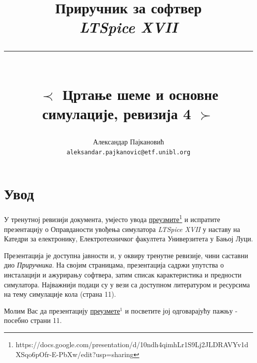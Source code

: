 

\title{
	\LARGE Приручник за софтвер \\ \smallskip
	\textit{LTSpice XVII} \\ 
	\noindent\rule{\textwidth}{0.1pt} \\ \medskip
	\large $\prec$ Цртање шеме и основне симулације, ревизија 4 $\succ$
}

\author{Александар Пајкановић \\
\footnotesize \texttt{aleksandar.pajkanovic@etf.unibl.org}}



\maketitle


\chapter{Увод}
\label{intro}

\noindent У тренутној ревизији документа, умјесто увода \href{https://docs.google.com/presentation/d/10ndh4qimhLr1S9Lj2JLDRAVYv1dXSqo6pOfr-E-PbXw/edit?usp=sharing}{преузмите\footnote{\url{https://docs.google.com/presentation/d/10ndh4qimhLr1S9Lj2JLDRAVYv1dXSqo6pOfr-E-PbXw/edit?usp=sharing}}} и испратите презентацију о Оправданости увођења симулатора \textit{LTSpice XVII} у наставу на Катедри за електронику, Електротехничког факултета Универзитета у Бањој Луци.

Презентација је доступна јавности и, у оквиру тренутне ревизије, чини саставни дио \textit{Приручника}. На својим страницама, презентација садржи упутства о инсталацији и ажурирању софтвера, затим списак карактеристика и предности симулатора. Најважнији подаци су у вези са доступном литературом и ресурсима на тему симулације кола (страна 11).

Молим Вас да презентацију \href{https://docs.google.com/presentation/d/10ndh4qimhLr1S9Lj2JLDRAVYv1dXSqo6pOfr-E-PbXw/edit?usp=sharing}{преузмете$^1$} и посветите јој одговарајућу пажњу - посебно страни 11.

